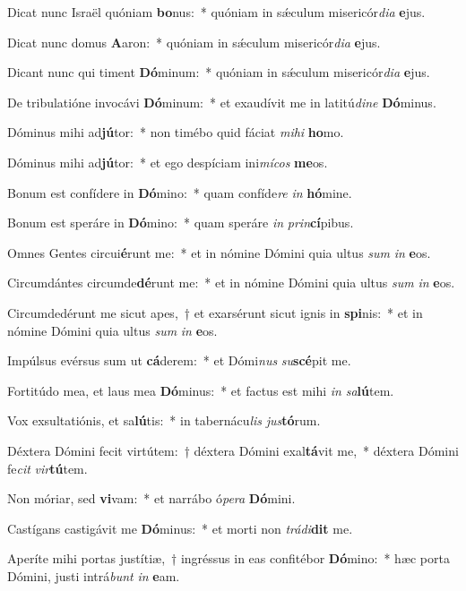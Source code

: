 \item Dicat nunc Israël quóniam \textbf{bo}nus:~* quóniam in sǽculum misericór\textit{di}\textit{a} \textbf{e}jus.
\item Dicat nunc domus \textbf{A}aron:~* quóniam in sǽculum misericór\textit{di}\textit{a} \textbf{e}jus.
\item Dicant nunc qui timent \textbf{Dó}minum:~* quóniam in sǽculum misericór\textit{di}\textit{a} \textbf{e}jus.
\item De tribulatióne invocávi \textbf{Dó}minum:~* et exaudívit me in latitú\textit{di}\textit{ne} \textbf{Dó}minus.
\item Dóminus mihi ad\textbf{jú}tor:~* non timébo quid fáciat \textit{mi}\textit{hi} \textbf{ho}mo.
\item Dóminus mihi ad\textbf{jú}tor:~* et ego despíciam ini\textit{mí}\textit{cos} \textbf{me}os.
\item Bonum est confídere in \textbf{Dó}mino:~* quam confíde\textit{re} \textit{in} \textbf{hó}mine.
\item Bonum est speráre in \textbf{Dó}mino:~* quam speráre \textit{in} \textit{prin}\textbf{cí}pibus.
\item Omnes Gentes circui\textbf{é}runt me:~* et in nómine Dómini quia ultus \textit{sum} \textit{in} \textbf{e}os.
\item Circumdántes circumde\textbf{dé}runt me:~* et in nómine Dómini quia ultus \textit{sum} \textit{in} \textbf{e}os.
\item Circumdedérunt me sicut apes,~† et exarsérunt sicut ignis in \textbf{spi}nis:~* et in nómine Dómini quia ultus \textit{sum} \textit{in} \textbf{e}os.
\item Impúlsus evérsus sum ut \textbf{cá}derem:~* et Dómi\textit{nus} \textit{su}\textbf{scé}pit me.
\item Fortitúdo mea, et laus mea \textbf{Dó}minus:~* et factus est mihi \textit{in} \textit{sa}\textbf{lú}tem.
\item Vox exsultatiónis, et sa\textbf{lú}tis:~* in tabernácu\textit{lis} \textit{jus}\textbf{tó}rum.
\item Déxtera Dómini fecit virtútem:~† déxtera Dómini exal\textbf{tá}vit me,~* déxtera Dómini fe\textit{cit} \textit{vir}\textbf{tú}tem.
\item Non móriar, sed \textbf{vi}vam:~* et narrábo ó\textit{pe}\textit{ra} \textbf{Dó}mini.
\item Castígans castigávit me \textbf{Dó}minus:~* et morti non \textit{trá}\textit{di}\textbf{dit} me.
\item Aperíte mihi portas justítiæ,~† ingréssus in eas confitébor \textbf{Dó}mino:~* hæc porta Dómini, justi intrá\textit{bunt} \textit{in} \textbf{e}am.
